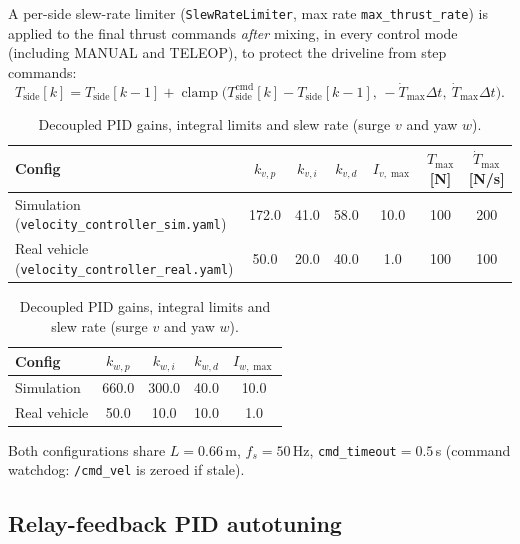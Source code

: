 A per-side slew-rate limiter (\texttt{SlewRateLimiter}, max rate \texttt{max\_thrust\_rate}) is applied to the final thrust commands \emph{after} mixing, in every control mode (including MANUAL and TELEOP), to protect the driveline from step commands:
\begin{equation}
T_{\text{side}}[k] = T_{\text{side}}[k-1] + \operatorname{clamp}\!\Big(T_{\text{side}}^{\text{cmd}}[k]-T_{\text{side}}[k-1],\, -\dot T_{\max}\Delta t,\ \dot T_{\max}\Delta t\Big).
\end{equation}

\begin{table}[H]
\centering
\caption{Decoupled PID gains, integral limits and slew rate (surge $v$ and yaw $w$).}
\label{tab:pid}
\begin{tabular}{@{}lcccccc@{}}
\toprule
Config & $k_{v,p}$ & $k_{v,i}$ & $k_{v,d}$ & $I_{v,\max}$ & $T_{\max}$ [N] & $\dot T_{\max}$ [N/s]\\
\midrule
Simulation (\texttt{velocity\_controller\_sim.yaml}) & 172.0 & 41.0 & 58.0 & 10.0 & 100 & 200 \\
Real vehicle (\texttt{velocity\_controller\_real.yaml}) & 50.0 & 20.0 & 40.0 & 1.0 & 100 & 100\\
\bottomrule
\end{tabular}
\vspace{4pt}
\begin{tabular}{@{}lcccc@{}}
\toprule
Config & $k_{w,p}$ & $k_{w,i}$ & $k_{w,d}$ & $I_{w,\max}$ \\
\midrule
Simulation & 660.0 & 300.0 & 40.0 & 10.0 \\
Real vehicle & 50.0 & 10.0 & 10.0 & 1.0 \\
\bottomrule
\end{tabular}
\end{table}

Both configurations share $L=0.66$\,m, $f_s=50$\,Hz, \texttt{cmd\_timeout}$=0.5$\,s (command watchdog: \texttt{/cmd\_vel} is zeroed if stale). 

\subsection{Relay-feedback PID autotuning}
\label{sec:autotune}

